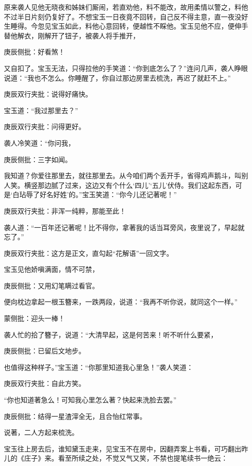 \begin{parag}
    原来袭人见他无晓夜和姊妹们厮闹，若直劝他，料不能改，故用柔情以警之，料他不过半日片刻仍复好了。不想宝玉一日夜竟不回转，自己反不得主意，直一夜没好生睡得。今忽见宝玉如此，料他心意回转，便越性不睬他。宝玉见他不应，便伸手替他解衣，刚解开了钮子，被袭人将手推开，\begin{note}庚辰侧批：好看煞！\end{note}又自扣了。宝玉无法，只得拉他的手笑道：“你到底怎么了？”连问几声，袭人睁眼说道：“我也不怎么。你睡醒了，你自过那边房里去梳洗，再迟了就赶不上。”\begin{note}庚辰双行夹批：说得好痛快。\end{note}宝玉道：“我过那里去？”\begin{note}庚辰双行夹批：问得更好。\end{note}袭人冷笑道：“你问我，\begin{note}庚辰侧批：三字如闻。\end{note}我知道？你爱往那里去，就往那里去。从今咱们两个丢开手，省得鸡声鹅斗，叫别人笑。横竖那边腻了过来，这边又有个什么‘四儿’‘五儿’伏侍。我们这起东西，可是‘白玷辱了好名好姓’的。”宝玉笑道：“你今儿还记著呢！”\begin{note}庚辰双行夹批：非浑一纯粹，那能至此！\end{note}袭人道：“一百年还记著呢！比不得你，拿著我的话当耳旁风，夜里说了，早起就忘了。”\begin{note}庚辰双行夹批：这方是正文，直勾起“花解语”一回文字。\end{note}宝玉见他娇嗔满面，情不可禁，\begin{note}庚辰侧批：又用幻笔瞒过看官。\end{note}便向枕边拿起一根玉簪来，一跌两段，说道：“我再不听你说，就同这个一样。”\begin{note}蒙侧批：迎头一棒！\end{note}袭人忙的拾了簪子，说道：“大清早起，这是何苦来！听不听什么要紧，\begin{note}庚辰侧批：已留后文地步。\end{note}也值得这种样子。”宝玉道：“你那里知道我心里急！”袭人笑道：\begin{note}庚辰双行夹批：自此方笑。\end{note}“你也知道著急么！可知我心里怎么著？快起来洗脸去罢。”\begin{note}庚辰侧批：结得一星渣滓全无，且合怡红常事。\end{note}说著，二人方起来梳洗。
\end{parag}


\begin{parag}
    宝玉往上房去后，谁知黛玉走来，见宝玉不在房中，因翻弄案上书看，可巧翻出昨儿的《庄子》来。看至所续之处，不觉又气又笑，不禁也提笔续书一绝云：
\end{parag}



